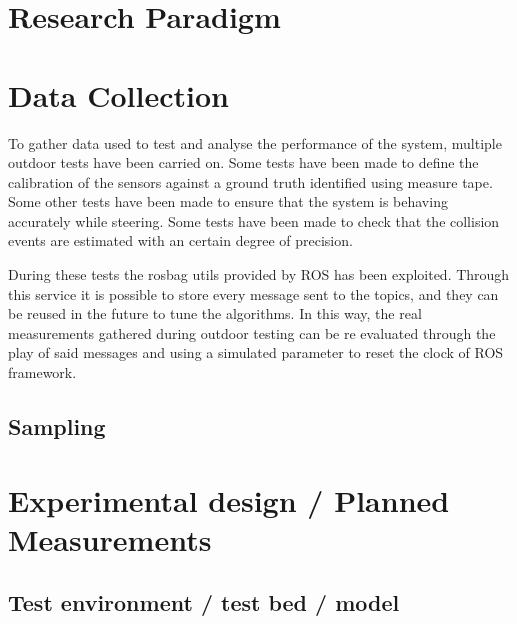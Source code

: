 
\section{Research Paradigm}
\label{sec:researchParadigm}

\section{Data Collection}
\label{sec:dataCollection}
To gather data used to test and analyse the performance of the system, multiple outdoor tests have been carried on.
Some tests have been made to define the calibration of the sensors against a ground truth identified using measure tape. 
Some other tests have been made to ensure that the system is behaving accurately while steering.
Some tests have been made to check that the collision events are estimated with an certain degree of precision.

During these tests the rosbag utils provided by ROS has been exploited. Through this service it is possible to store every message sent to the topics, and they can be reused in the future to tune the algorithms.
In this way, the real measurements gathered during outdoor testing can be re evaluated through the play of said messages and using a simulated parameter to reset the clock of ROS framework.



\subsection{Sampling}


\section{Experimental design / Planned Measurements}
\label{sec:experimentalDesign}

\subsection{Test environment / test bed / model}

